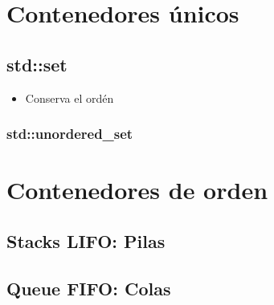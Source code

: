 \documentclass[12pt, fleqn]{report}                             %
\theoremstyle{break}                                            %
\begin{document}
    \chapter{Contenedores únicos}
    
        \section{std::set}

            \begin{itemize}
                \item Conserva el ordén
            \end{itemize}


            \subsection{std::unordered\_set}


    \clearpage
    \chapter{Contenedores de orden}
                
        \clearpage
        \section{Stacks LIFO: Pilas}

        \clearpage
        \section{Queue FIFO: Colas}
\end{document}

